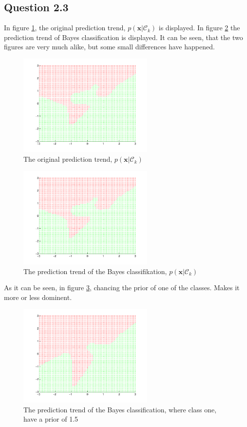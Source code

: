 \subsection*{Question 2.3}

In figure \ref{fig:q23a}, the original prediction trend,
$p(\mathbf{x}|\mathcal{C}_k)$ is displayed. In figure \ref{fig:q23b}
the prediction trend of Bayes classification is displayed. It can be
seen, that the two figures are very much alike, but some small
differences have happened.

\begin{figure}[!htbp]
  \centering
  \includegraphics[width=0.6\textwidth]{./images/q23a.pdf}
  \caption{The original prediction trend, $p(\mathbf{x}|\mathcal{C}_k)$}
  \label{fig:q23a}
\end{figure}

\begin{figure}[!htbp]
  \centering
  \includegraphics[width=0.6\textwidth]{./images/q23b.pdf}
  \caption{The prediction trend of the Bayes classifikation, $p(\mathbf{x}|\mathcal{C}_k)$}
  \label{fig:q23b}
\end{figure}

As it can be seen, in figure \ref{fig:q23c}, chancing the prior of one of
the classes. Makes it more or less dominent.

\begin{figure}[!htbp]
  \centering
  \includegraphics[width=0.6\textwidth]{./images/q23c.pdf}
  \caption{The prediction trend of the Bayes classification, where class one, have a prior of 1.5}
  \label{fig:q23c}
\end{figure}

